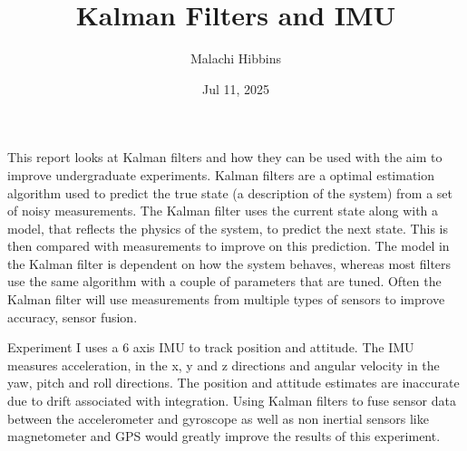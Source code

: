 \documentclass[letterpaper,10pt,english]{jupyterBook}
\title{Kalman Filters and IMU}
\date{Jul 11, 2025}
\author{Malachi Hibbins}
\begin{document}
\pagestyle{empty}
\sphinxmaketitle
\pagestyle{plain}
\sphinxtableofcontents
\pagestyle{normal}
\label{\detokenize{0Intro::doc}}


\sphinxAtStartPar
This report looks at Kalman filters and how they can be used with the aim to improve undergraduate experiments. Kalman filters are a optimal estimation algorithm used to predict the true state (a description of the system) from a set of noisy measurements. The Kalman filter uses the current state along with a model, that reflects the physics of the system, to predict the next state. This is then compared with measurements to improve on this prediction. The model in the Kalman filter is dependent on how the system behaves, whereas most filters use the same algorithm with a couple of parameters that are tuned. Often the Kalman filter will use measurements from multiple types of sensors to improve accuracy, sensor fusion.

\sphinxAtStartPar
Experiment I uses a 6 axis IMU to track position and attitude. The IMU measures acceleration, in the x, y and z directions and angular velocity in the yaw, pitch and roll directions. The position and attitude estimates are inaccurate due to drift associated with integration. Using Kalman filters to fuse sensor data between the accelerometer and gyroscope as well as non inertial sensors like magnetometer and GPS would greatly improve the results of this experiment.
\end{document}
